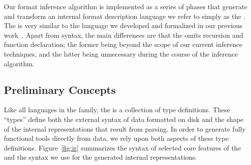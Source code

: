 Our format inference algorithm is implemented as a series of phases that
generate and transform an internal format description language we
refer to simply as the \ir.  The \ir{} is very similar to
the \ipads{} language we developed and formalized in our previous 
work~\cite{fisher+:popl06}.  Apart from syntax, the main differences 
are that the \ir{} omits recursion and function declaration; the former
being beyond the scope of our current inference techniques, and the 
latter being unnecessary during the course of the inference algorithm.  

\subsection{Preliminary Concepts}

Like all languages in the \pads{} family, the \ir{} is a collection of
type definitions.  These ``types'' define both the external syntax of
data formatted on disk and the shape of the internal representations
that result from parsing.  In order to generate fully functional tools
directly from data, we rely upon both aspects of these type definitions.
Figure~\ref{fig:ir} summarizes the syntax of selected core features of 
the \ir{} and the syntax we use for the generated internal representations.


